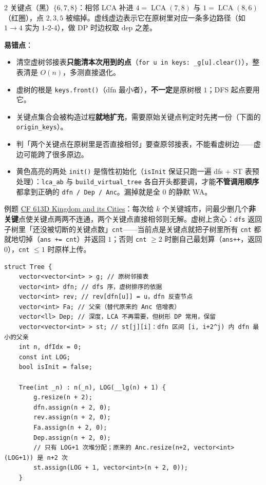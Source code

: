 \begin{multicols*}{2}
		关键点（黑）$\{6,7,8\}$：相邻 LCA 补进 $4 = \operatorname{LCA}(7,8)$ 与 $1 = \operatorname{LCA}(8,6)$（红圈），点 $2,3,5$ 被缩掉。虚线虚边表示它在原树里对应一条多边路径（如 $1 \to 4$ 实为 $1\text{-}2\text{-}4$），做 DP 时边权取 $\text{dep}$ 之差。

		\textbf{易错点}：

		\begin{itemize}
			\item 清空虚树邻接表\textbf{只能清本次用到的点}（\texttt{for u in keys: \_g[u].clear()}），整表清是 $O(n)$，多测直接退化。
			\item 虚树的根是 \texttt{keys.front()}（dfn 最小者），\textbf{不一定}是原树根 $1$；DFS 起点要用它。
			\item 关键点集合会被构造过程\textbf{就地扩充}，需要原始关键点判定时先拷一份（下面的 \texttt{origin\_keys}）。
			\item 判「两个关键点在原树里是否直接相邻」要查原邻接表，不能看虚树边——虚边可能跨了很多原边。
			\item \colorbox{yellow!45}{黄色高亮的两处 \texttt{init()}} 是惰性初始化（\texttt{isInit} 保证只跑一遍 dfs + ST 表预处理）：\texttt{lca\_ab} 与 \texttt{build\_virtual\_tree} 各自开头都要调，才能\textbf{不管调用顺序}都拿到正确的 \texttt{dfn / Dep / Anc}。漏掉就是全 $0$ 的静默 WA。
		\end{itemize}

		例题 \href{https://codeforces.com/contest/613/problem/D}{CF 613D Kingdom and its Cities}：每次给 $k$ 个关键城市，问最少删几个\textbf{非关键}点使关键点两两不连通，两个关键点直接相邻则无解。虚树上贪心：\texttt{dfs} 返回子树里「还没被切断的关键点数」\texttt{cnt}——当前点是关键点就把子树里所有 \texttt{cnt} 都就地切掉（\texttt{ans += cnt}）并返回 $1$；否则 \texttt{cnt} $\geq 2$ 时删自己最划算（\texttt{ans++}，返回 $0$），\texttt{cnt} $\leq 1$ 时原样上传。

		\begin{verbatim}
struct Tree {
    vector<vector<int> > g; // 原树邻接表
    vector<int> dfn; // dfs 序，虚树排序的依据
    vector<int> rev; // rev[dfn[u]] = u，dfn 反查节点
    vector<int> Fa; // 父亲（替代原来的 Anc 倍增表）
    vector<ll> Dep; // 深度，LCA 不再需要，但树形 DP 常用，保留
    vector<vector<int> > st; // st[j][i]：dfn 区间 [i, i+2^j) 内 dfn 最小的父亲
    int n, dfIdx = 0;
    const int LOG;
    bool isInit = false;

    Tree(int _n) : n(_n), LOG(__lg(n) + 1) {
        g.resize(n + 2);
        dfn.assign(n + 2, 0);
        rev.assign(n + 2, 0);
        Fa.assign(n + 2, 0);
        Dep.assign(n + 2, 0);
        // 只有 LOG+1 次堆分配；原来的 Anc.resize(n+2, vector<int>(LOG+1)) 是 n+2 次
        st.assign(LOG + 1, vector<int>(n + 2, 0));
    }


\end{verbatim}
\end{multicols*}
